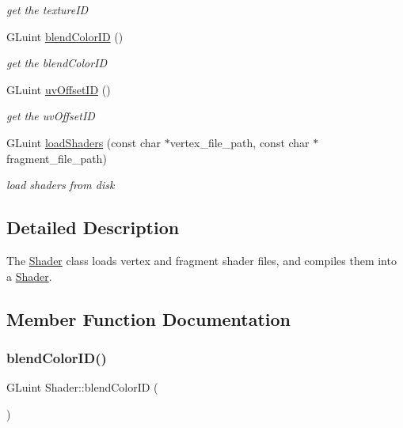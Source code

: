 \begin{DoxyCompactItemize}
\begin{DoxyCompactList}\small\item\em get the texture\+ID \end{DoxyCompactList}\item 
G\+Luint \hyperlink{class_shader_a3c7b58c01112d49cd433fa6479d54efb}{blend\+Color\+ID} ()
\begin{DoxyCompactList}\small\item\em get the blend\+Color\+ID \end{DoxyCompactList}\item 
G\+Luint \hyperlink{class_shader_af2060ae1c85d8db67389c8116a02d9dd}{uv\+Offset\+ID} ()
\begin{DoxyCompactList}\small\item\em get the uv\+Offset\+ID \end{DoxyCompactList}\item 
G\+Luint \hyperlink{class_shader_a7bc0245aea0f7c61d17a17273c2faaaf}{load\+Shaders} (const char $\ast$vertex\+\_\+file\+\_\+path, const char $\ast$fragment\+\_\+file\+\_\+path)
\begin{DoxyCompactList}\small\item\em load shaders from disk \end{DoxyCompactList}\end{DoxyCompactItemize}


\subsection{Detailed Description}
The \hyperlink{class_shader}{Shader} class loads vertex and fragment shader files, and compiles them into a \hyperlink{class_shader}{Shader}. 

\subsection{Member Function Documentation}
\mbox{\label{class_shader_a3c7b58c01112d49cd433fa6479d54efb}} 
\subsubsection{\texorpdfstring{blend\+Color\+I\+D()}{blendColorID()}}
{\footnotesize\ttfamily G\+Luint Shader\+::blend\+Color\+ID (\begin{DoxyParamCaption}{ }\end{DoxyParamCaption})\hspace{0.3cm}{\ttfamily [inline]}}



